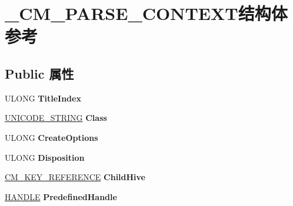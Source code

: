 \hypertarget{struct___c_m___p_a_r_s_e___c_o_n_t_e_x_t}{}\section{\+\_\+\+C\+M\+\_\+\+P\+A\+R\+S\+E\+\_\+\+C\+O\+N\+T\+E\+X\+T结构体 参考}
\label{struct___c_m___p_a_r_s_e___c_o_n_t_e_x_t}
\subsection*{Public 属性}
\begin{DoxyCompactItemize}
\item 
\mbox{\label{struct___c_m___p_a_r_s_e___c_o_n_t_e_x_t_a5d2e56debccfa8ba41920a8143bdf737}} 
U\+L\+O\+NG {\bfseries Title\+Index}
\item 
\mbox{\label{struct___c_m___p_a_r_s_e___c_o_n_t_e_x_t_aaffceb0c97688842148b5966c9190583}} 
\hyperlink{struct___u_n_i_c_o_d_e___s_t_r_i_n_g}{U\+N\+I\+C\+O\+D\+E\+\_\+\+S\+T\+R\+I\+NG} {\bfseries Class}
\item 
\mbox{\label{struct___c_m___p_a_r_s_e___c_o_n_t_e_x_t_ad5f3ac93c4de28cd51078fe49205cfb4}} 
U\+L\+O\+NG {\bfseries Create\+Options}
\item 
\mbox{\label{struct___c_m___p_a_r_s_e___c_o_n_t_e_x_t_a7dc303fb1c0da1c8fe27981409474daa}} 
U\+L\+O\+NG {\bfseries Disposition}
\item 
\mbox{\label{struct___c_m___p_a_r_s_e___c_o_n_t_e_x_t_a4906f14d72ddc87c31babad81e1b1c82}} 
\hyperlink{struct___c_m___k_e_y___r_e_f_e_r_e_n_c_e}{C\+M\+\_\+\+K\+E\+Y\+\_\+\+R\+E\+F\+E\+R\+E\+N\+CE} {\bfseries Child\+Hive}
\item 
\mbox{\label{struct___c_m___p_a_r_s_e___c_o_n_t_e_x_t_a1ac134d5952b89e7f34e218ca7239271}} 
\hyperlink{interfacevoid}{H\+A\+N\+D\+LE} {\bfseries Predefined\+Handle}
\item 
\mbox{\label{struct___c_m___p_a_r_s_e___c_o_n_t_e_x_t_a8035278f9e4478249362cc11a285f57a}} 

\end{DoxyCompactItemize}
